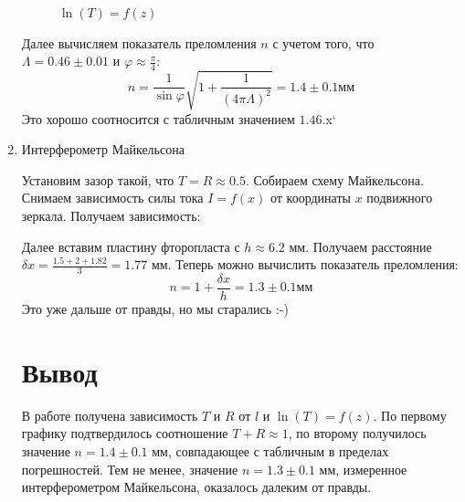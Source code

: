 \documentclass[a4paper,12pt]{article}
\renewcommand{\phi}{\ensuremath{\varphi}}
\theoremstyle{plain} %
\theoremstyle{definition} %
\theoremstyle{remark} %
\begin{document}
\begin{enumerate}
\begin{figure}[h!]
	\caption{$\ln(T) = f(z)$}
\end{figure}

Далее вычисляем показатель преломления $n$ с учетом того, что $\Lambda = 0.46 \pm 0.01$ и $\phi \approx \frac{\pi}{4}$:
\[
n = \frac{1}{\sin\phi}\sqrt{1+ \frac{1}{(4\pi\Lambda)^2}} = 1.4 \pm 0.1 \text{мм}
\]
Это хорошо соотносится с табличным значением $1.46$.x`
\item Интерферометр Майкельсона

Установим зазор такой, что $T = R \approx 0.5$. Собираем схему Майкельсона. Снимаем зависимость силы тока $I = f(x)$ от координаты $x$ подвижного зеркала. Получаем  зависимость:

Далее вставим пластину фторопласта с $h \approx 6.2$ мм. Получаем расстояние $\delta x = \frac{1.5+2+1.82}{3} = 1.77  $ мм.
Теперь можно вычислить показатель преломления:
\[
n = 1 + \frac{\delta x }{h} = 1.3 \pm 0.1 \text{мм}
\]
Это уже дальше от правды, но мы старались :-)

\section{Вывод}

В работе получена зависимость $T$ и $R$ от $l$ и $\ln(T) = f(z)$. По первому графику подтвердилось соотношение $T+R \approx 1$, по второму получилось значение $n = 1.4 \pm 0.1$ мм, совпадающее с табличным в пределах погрешностей.
Тем не менее, значение $n = 1.3 \pm 0.1 $ мм, измеренное интерферометром Майкельсона, оказалось далеким от правды.






\end{enumerate}
\end{document}
